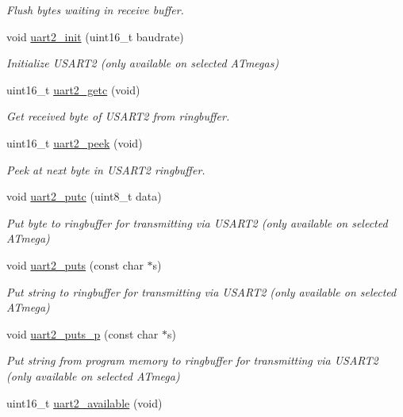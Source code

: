 \begin{DoxyCompactItemize}
\begin{DoxyCompactList}\small\item\em Flush bytes waiting in receive buffer. \end{DoxyCompactList}\item 
void \hyperlink{group__avr-uart_gae2a543d34d454fb4f41fe80fee0ae0bb}{uart2\+\_\+init} (uint16\+\_\+t baudrate)
\begin{DoxyCompactList}\small\item\em Initialize U\+S\+A\+R\+T2 (only available on selected A\+Tmegas) \end{DoxyCompactList}\item 
uint16\+\_\+t \hyperlink{group__avr-uart_gafcfa52b819c52e3a8b4cfdc74fe9efb3}{uart2\+\_\+getc} (void)
\begin{DoxyCompactList}\small\item\em Get received byte of U\+S\+A\+R\+T2 from ringbuffer. \end{DoxyCompactList}\item 
\hypertarget{group__avr-uart_gaccc2bf6c89f4d38149144056e6a4d64e}{}uint16\+\_\+t \hyperlink{group__avr-uart_gaccc2bf6c89f4d38149144056e6a4d64e}{uart2\+\_\+peek} (void)\label{group__avr-uart_gaccc2bf6c89f4d38149144056e6a4d64e}

\begin{DoxyCompactList}\small\item\em Peek at next byte in U\+S\+A\+R\+T2 ringbuffer. \end{DoxyCompactList}\item 
void \hyperlink{group__avr-uart_gab16a85e4f634fd77fb43ed8747ed119c}{uart2\+\_\+putc} (uint8\+\_\+t data)
\begin{DoxyCompactList}\small\item\em Put byte to ringbuffer for transmitting via U\+S\+A\+R\+T2 (only available on selected A\+Tmega) \end{DoxyCompactList}\item 
void \hyperlink{group__avr-uart_ga2bd69cbc0e1c8b8343ceae0466889218}{uart2\+\_\+puts} (const char $\ast$s)
\begin{DoxyCompactList}\small\item\em Put string to ringbuffer for transmitting via U\+S\+A\+R\+T2 (only available on selected A\+Tmega) \end{DoxyCompactList}\item 
void \hyperlink{group__avr-uart_ga827c36b80bba4bee87fdda34efa327b8}{uart2\+\_\+puts\+\_\+p} (const char $\ast$s)
\begin{DoxyCompactList}\small\item\em Put string from program memory to ringbuffer for transmitting via U\+S\+A\+R\+T2 (only available on selected A\+Tmega) \end{DoxyCompactList}\item 
\hypertarget{group__avr-uart_ga07c846344e698ef12323da238152990b}{}uint16\+\_\+t \hyperlink{group__avr-uart_ga07c846344e698ef12323da238152990b}{uart2\+\_\+available} (void)\label{group__avr-uart_ga07c846344e698ef12323da238152990b}


\end{DoxyCompactItemize}
